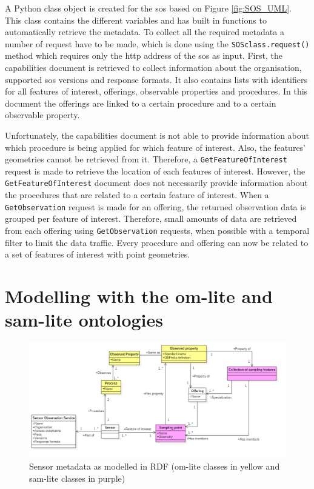A Python class object is created for the \ac{sos} based on Figure \ref{fig:SOS_UML}. This class contains the different variables and has built in functions to automatically retrieve the metadata. To collect all the required metadata a number of request have to be made, which is done using the \texttt{SOSclass.request()} method which requires only the \ac{http} address of the \ac{sos} as input. First, the capabilities document is retrieved to collect information about the organisation, supported \ac{sos} versions and response formats. It also contains lists with identifiers for all features of interest, offerings, observable properties and procedures. In this document the offerings are linked to a certain procedure and to a certain observable property. 

Unfortunately, the capabilities document is not able to provide information about which procedure is being applied for which feature of interest. Also, the features' geometries cannot be retrieved from it. Therefore, a \texttt{GetFeatureOfInterest} request is made to retrieve the location of each features of interest. However, the \texttt{GetFeatureOfInterest} document does not necessarily provide information about the procedures that are related to a certain feature of interest. When a \texttt{GetObservation} request is made for an offering, the returned observation data is grouped per feature of interest. 
Therefore, small amounts of data are retrieved from each offering using \texttt{GetObservation} requests, when possible with a temporal filter to limit the data traffic. %
Every procedure and offering can now be related to a set of features of interest with point geometries.  
 

\section{Modelling with the om-lite and sam-lite ontologies}
\begin{figure}
	\centering
	\includegraphics[width=1\linewidth]{UML/SOS_Semantic_UML.PNG}
	\caption{Sensor metadata as modelled in RDF (om-lite classes in yellow and sam-lite classes in purple)}
	\label{fig:SOS_Semantic_UML}
\end{figure}

